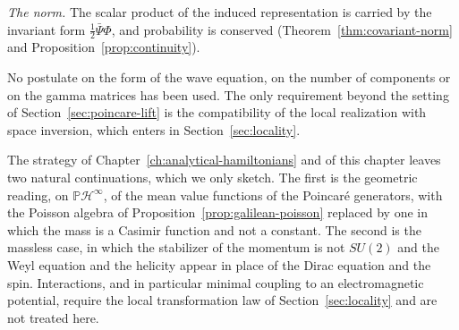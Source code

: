 \begin{remark}
		\emph{The norm.} The scalar product of the induced representation is carried by the invariant form $\frac12\bar{\Psi}\Phi$, and probability is conserved (Theorem~\ref{thm:covariant-norm} and Proposition~\ref{prop:continuity}).
		
		No postulate on the form of the wave equation, on the number of components or on the gamma matrices has been used. The only requirement beyond the setting of Section~\ref{sec:poincare-lift} is the compatibility of the local realization with space inversion, which enters in Section~\ref{sec:locality}.
	\end{remark}
	
	\begin{remark}[Outlook]\label{rem:dirac-outlook}
		The strategy of Chapter~\ref{ch:analytical-hamiltonians} and of this chapter leaves two natural continuations, which we only sketch. The first is the geometric reading, on $\mathbb{P}\mathcal{H}^\infty$, of the mean value functions of the Poincar\'e generators, with the Poisson algebra of Proposition~\ref{prop:galilean-poisson} replaced by one in which the mass is a Casimir function and not a constant. The second is the massless case, in which the stabilizer of the momentum is not $SU(2)$ and the Weyl equation and the helicity appear in place of the Dirac equation and the spin. Interactions, and in particular minimal coupling to an electromagnetic potential, require the local transformation law of Section~\ref{sec:locality} and are not treated here.
	\end{remark}
	
